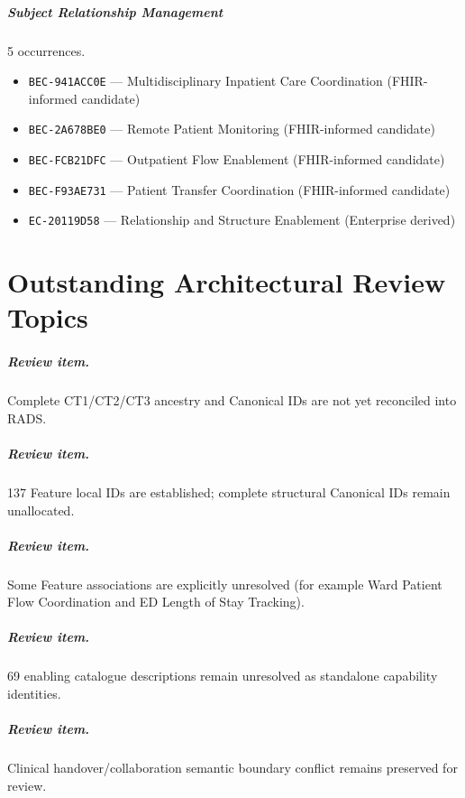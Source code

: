\documentclass[11pt,a4paper,openany]{book}
\begin{document}
\paragraph{Subject Relationship Management} 5 occurrences.\par
\begin{itemize}
\item \texttt{BEC-941ACC0E} --- Multidisciplinary Inpatient Care Coordination (FHIR-informed candidate)
\item \texttt{BEC-2A678BE0} --- Remote Patient Monitoring (FHIR-informed candidate)
\item \texttt{BEC-FCB21DFC} --- Outpatient Flow Enablement (FHIR-informed candidate)
\item \texttt{BEC-F93AE731} --- Patient Transfer Coordination (FHIR-informed candidate)
\item \texttt{EC-20119D58} --- Relationship and Structure Enablement (Enterprise derived)
\end{itemize}
\chapter{Outstanding Architectural Review Topics}
\paragraph{Review item.} Complete CT1/CT2/CT3 ancestry and Canonical IDs are not yet reconciled into RADS.\par
\paragraph{Review item.} 137 Feature local IDs are established; complete structural Canonical IDs remain unallocated.\par
\paragraph{Review item.} Some Feature associations are explicitly unresolved (for example Ward Patient Flow Coordination and ED Length of Stay Tracking).\par
\paragraph{Review item.} 69 enabling catalogue descriptions remain unresolved as standalone capability identities.\par
\paragraph{Review item.} Clinical handover/collaboration semantic boundary conflict remains preserved for review.\par
\end{document}

